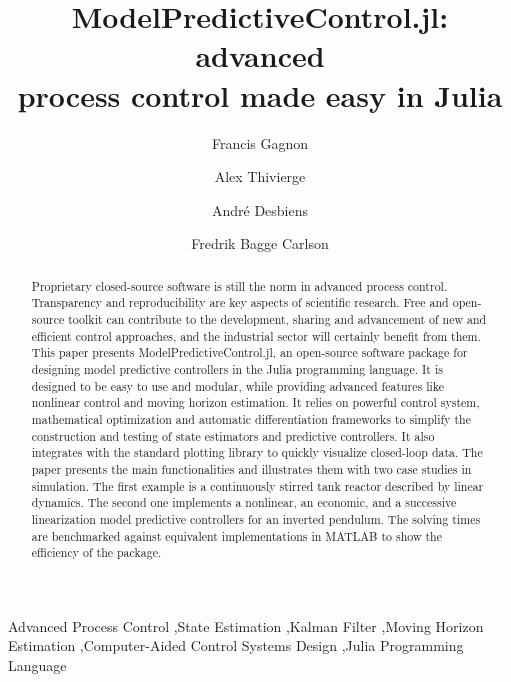 \documentclass[5p,authoryear]{elsarticle}
\begin{document}
\begin{frontmatter}

\title{ModelPredictiveControl.jl: advanced\\process control made easy in Julia}

\author[jumineandvendel]{Francis Gagnon}
\author[jumine]{Alex Thivierge}
\author[loop]{André Desbiens}
\author[juliahub]{Fredrik Bagge Carlson}

\address[jumineandvendel]{Work mainly performed while at: Jumine, Quebec City, Canada. Currently at: Vendel, Quebec City, Canada}
\address[jumine]{Jumine, Quebec City, Canada}
\address[loop]{Process Observation and Optimization Laboratory (LOOP), Université Laval, Quebec City, Canada}
\address[juliahub]{JuliaHub, Lund, Sweden}

\begin{abstract}
Proprietary closed-source software is still the norm in advanced process control. Transparency and reproducibility are key aspects of scientific research. Free and open-source toolkit can contribute to the development, sharing and advancement of  new and efficient control approaches, and the industrial sector will certainly benefit from them. This paper presents ModelPredictiveControl.jl, an open-source software package for designing model predictive controllers in the Julia programming language. It is designed to be easy to use and modular, while providing advanced features like nonlinear control and moving horizon estimation. It relies on powerful control system, mathematical optimization and automatic differentiation frameworks to simplify the construction and testing of state estimators and predictive controllers. It also integrates with the standard plotting library to quickly visualize closed-loop data. The paper presents the main functionalities and illustrates them with two case studies in simulation. The first example is a continuously stirred tank reactor described by linear dynamics. The second one implements a nonlinear, an economic, and a successive linearization model predictive controllers for an inverted pendulum. The solving times are benchmarked against equivalent implementations in MATLAB to show the efficiency of the package.
\end{abstract}
    

\begin{keyword}
Advanced Process Control \sep State Estimation \sep Kalman Filter \sep Moving Horizon Estimation \sep Computer-Aided Control Systems Design \sep Julia Programming Language
\end{keyword}

\end{frontmatter}
\end{document}
